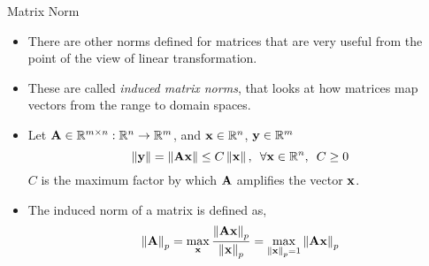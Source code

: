 \documentclass[aspectratio=169]{beamer}
\def\mf{\ensuremath\mathbf}
\def\mb{\ensuremath\mathbb}
\def\lV{\ensuremath\left\lVert}
\def\rV{\ensuremath\right\rVert}
\begin{document}
\begin{frame}[t]{Matrix Norm}
\begin{itemize}
    \item There are other norms defined for matrices that are very useful from the point of the view of linear transformation.

    \item These are called \textit{induced matrix norms}, that looks at how matrices map vectors from the range to domain spaces.

    \item Let $\mf{A} \in \mb{R}^{m \times n}: \mb{R}^n \to \mb{R}^m$, and $\mf{x} \in \mb{R}^n$, $\mf{y} \in \mb{R}^m$
    \[ \lV \mf{y} \rV = \lV \mf{A}\mf{x} \rV \leq C\lV\mf{x}\rV, \,\,\, \forall \mf{x} \in \mb{R}^n, \,\,\, C \geq 0 \]
    $C$ is the maximum factor by which $\mf{A}$ amplifies the vector $\mf{x}$.
    \item The induced norm of a matrix is defined as,
    \[  \lV \mf{A} \rV_p = \max_{\mf{x}} \frac{\lV \mf{A}\mf{x}\rV_p}{\lV \mf{x}\rV_p} = \max_{\lV\mf{x}\rV_p = 1} {\lV \mf{A}\mf{x}\rV_p} \]

\end{itemize}
\end{frame}
\end{document}
